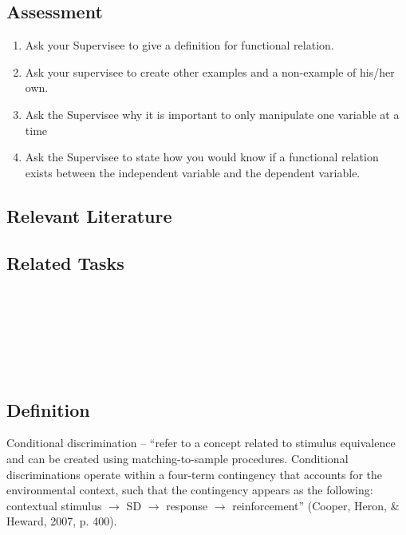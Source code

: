 \subsection{Assessment}
\begin{enumerate}
\item Ask your Supervisee to give a definition for functional relation.
\item Ask your supervisee to create other examples and a non-example of his/her own. 
\item Ask the Supervisee why it is important to only manipulate one variable at a time
\item Ask the Supervisee to state how you would know if a functional relation exists between the independent variable and the dependent variable. 
%
\end{enumerate}
%
\subsection{Relevant Literature}
\begin{refsection}
\nocite{test,alang2017police,clayton2018black}
\printbibliography[heading=none]
\end{refsection}
%
\subsection{Related Tasks}
\fourbThree{}\\
\fourFKThirtyThree{}\\
\fourhThree{}\\
\fourhFive{}\\
\fouriFive{}\\
%
%
%
%
%
%
\section{\fourFKThirtyFour{}}
\subsection{Definition}
Conditional discrimination – ``refer to a concept related to stimulus equivalence and can be created using matching-to-sample procedures.  Conditional discriminations operate within a four-term contingency that accounts for the environmental context, such that the contingency appears as the following: contextual stimulus $\rightarrow$ SD $\rightarrow$ response $\rightarrow$ reinforcement'' (Cooper, Heron, \& Heward, 2007, p. 400).\\

